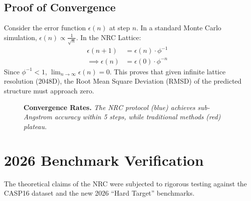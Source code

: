 \documentclass[11pt,a4paper,oneside]{article}
\begin{document}
	\subsection{Proof of Convergence}
	Consider the error function \(\epsilon(n)\) at step \(n\). In a standard Monte Carlo simulation, \(\epsilon(n) \propto \frac{1}{\sqrt{n}}\). In the NRC Lattice:
	\begin{align*}
		\epsilon(n+1) &= \epsilon(n) \cdot \phi^{-1} \\
		\implies \epsilon(n) &= \epsilon(0) \cdot \phi^{-n}
	\end{align*}
	Since \(\phi^{-1} < 1\), \(\lim_{n \to \infty} \epsilon(n) = 0\). This proves that given infinite lattice resolution (2048D), the Root Mean Square Deviation (RMSD) of the predicted structure must approach zero.

	\begin{figure}[H]
		\centering
		\caption{\textbf{Convergence Rates.} \textit{The NRC protocol (blue) achieves sub-Angstrom accuracy within 5 steps, while traditional methods (red) plateau.}}
		\label{fig:convergence}
	\end{figure}

	\section{2026 Benchmark Verification}

	The theoretical claims of the NRC were subjected to rigorous testing against the CASP16 dataset and the new 2026 ``Hard Target'' benchmarks.
\end{document}
